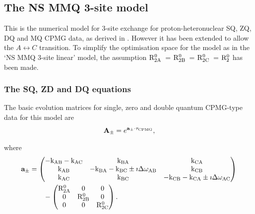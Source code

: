 
\subsection{The NS MMQ 3-site model}
\label{sect: dispersion: NS MMQ 3-site model}

This is the numerical model for 3-site exchange for proton-heteronuclear SQ, ZQ, DQ and MQ CPMG data, as derived in \citep{Korzhnev04a,Korzhnev04b,Korzhnev05b}.
However it has been extended to allow the $A \leftrightarrow C$ transition.
To simplify the optimisation space for the model as in the `NS MMQ 3-site linear' model, the assumption $\mathrm{R}_\mathrm{2A}^0$~= $\mathrm{R}_\mathrm{2B}^0$~= $\mathrm{R}_\mathrm{2C}^0$~= $\mathrm{R}_2^0$ has been made.


\subsubsection{The SQ, ZD and DQ equations}

The basic evolution matrices for single, zero and double quantum CPMG-type data for this model are
\begin{equation}
    \mathbf{A_\pm} = e^{\mathbf{a_\pm} \cdot \tau_\textrm{CPMG}},
\end{equation}

where
\begin{align}
    \mathbf{a_\pm} &= \begin{pmatrix}
                        -\textrm{k}_\textrm{AB} -\textrm{k}_\textrm{AC} & \textrm{k}_\textrm{BA}                          & \textrm{k}_\textrm{CA} \\
                        \textrm{k}_\textrm{AB}        & -\textrm{k}_\textrm{BA} -\textrm{k}_\textrm{BC} \pm\imath\Delta\omega_\textrm{AB}    & \textrm{k}_\textrm{CB} \\
                        \textrm{k}_\textrm{AC}        & \textrm{k}_\textrm{BC}                          & -\textrm{k}_\textrm{CB} -\textrm{k}_\textrm{CA} \pm\imath\Delta\omega_\textrm{AC}
                      \end{pmatrix}  \nonumber \\
                   &\qquad - \begin{pmatrix}
                               \mathrm{R}_\mathrm{2A}^0 & 0          & 0    \\
                               0          & \mathrm{R}_\mathrm{2B}^0 & 0    \\
                               0          & 0          & \mathrm{R}_\mathrm{2C}^0
                             \end{pmatrix}.
\end{align}


